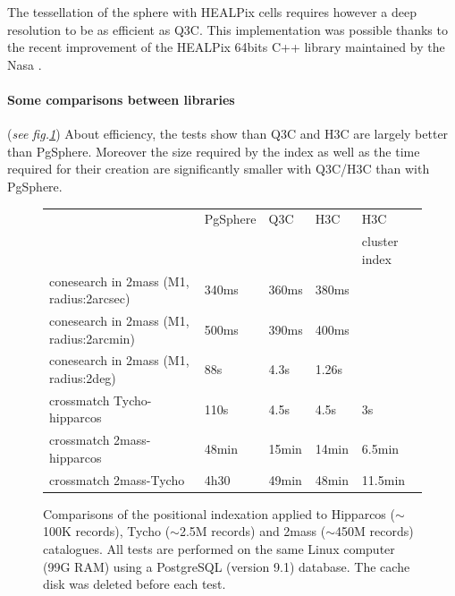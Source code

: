 \documentclass[11pt]{article}
\begin{document}
The tessellation of the sphere with HEALPix cells requires however
a deep resolution 
to be as efficient as Q3C. This implementation was possible thanks to the recent
improvement of the  HEALPix 64bits C++ library maintained by the Nasa 
\citep{gorski_healpix}.


\paragraph{Some comparisons between libraries} (\textit{see fig.\ref{P044:comparative}})
About efficiency, the tests show than Q3C and H3C are largely better than 
PgSphere. Moreover the size required by the index
as well as the time required for their creation
are significantly smaller with Q3C/H3C than with PgSphere.

\begin{figure}[htp] \center
\begin{small}
\begin{tabular}{lllll}%
 & PgSphere & Q3C & H3C & H3C  \\
 &          &     &     &{\scriptsize cluster index} \\ %
conesearch in 2mass (M1, radius:2arcsec) & 340ms& 360ms& 380ms &\\ %
conesearch in 2mass (M1, radius:2arcmin) & 500ms& 390ms& 400ms &\\ %
conesearch in 2mass (M1, radius:2deg)    & 88s& 4.3s& 1.26s &\\ %
crossmatch Tycho-hipparcos & 110s & 4.5s &  4.5s & 3s\\ %
crossmatch 2mass-hipparcos & 48min & 15min & 14min & 6.5min\\ %
crossmatch 2mass-Tycho     & 4h30 & 49min  & 48min & 11.5min\\ %
\end{tabular}
\end{small}
\caption{Comparisons of the positional indexation applied to Hipparcos 
($\sim$100K records), Tycho ($\sim$2.5M records) and 2mass ($\sim$450M records)
catalogues. All tests are performed on the same Linux computer (99G RAM) using a
PostgreSQL (version 9.1) database. The cache disk was deleted before each test.}
\label{P044:comparative}
\end{figure}
\end{document}
